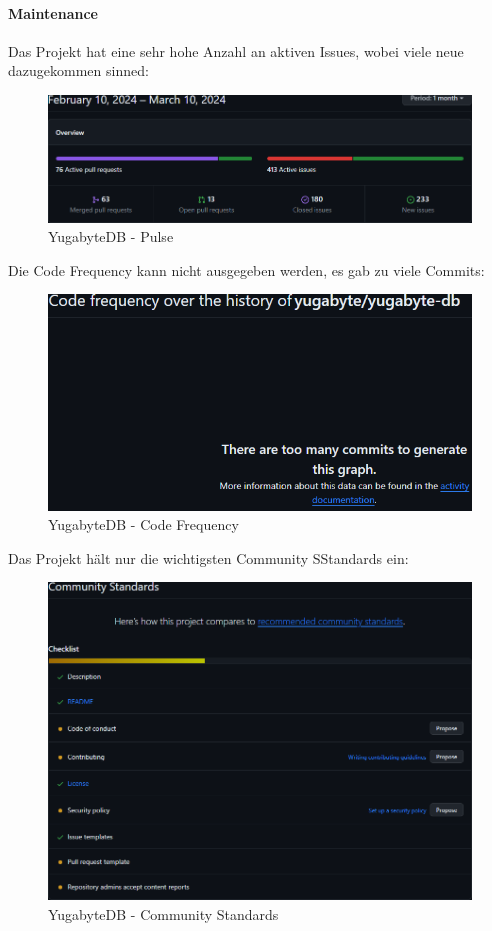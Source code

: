 \begin{flushleft}
    \paragraph{Maintenance}
    Das Projekt hat eine sehr hohe Anzahl an aktiven Issues, wobei viele neue dazugekommen sinned:
    \begin{figure}[H]
        \centering
        \includegraphics[width=0.75\linewidth]{source/implementation/evaluation/postgresql_ha_solutions/insights/yugabytedb/pulse_yugabyte_yugabyte-db}
        \caption{YugabyteDB - Pulse}
        \label{fig:pulse_yugabyte_yugabyte-db}
    \end{figure}

    Die Code Frequency kann nicht ausgegeben werden, es gab zu viele Commits:
    \begin{figure}[H]
        \centering
        \includegraphics[width=0.75\linewidth]{source/implementation/evaluation/postgresql_ha_solutions/insights/yugabytedb/code_frequency_yugabyte_yugabyte-db}
        \caption{YugabyteDB - Code Frequency}
        \label{fig:code_frequency_yugabyte_yugabyte-db}
    \end{figure}

    Das Projekt hält nur die wichtigsten Community SStandards ein:
    \begin{figure}[H]
        \centering
        \includegraphics[width=0.75\linewidth]{source/implementation/evaluation/postgresql_ha_solutions/insights/yugabytedb/community Standards}
        \caption{YugabyteDB - Community Standards}
        \label{fig:community Standards_yugabyte-db}
    \end{figure}


\end{flushleft}
